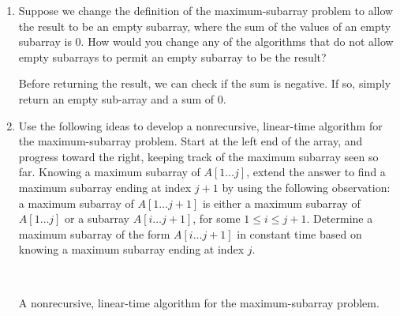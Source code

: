 \documentclass[Chapter04]{subfiles}
\begin{document}
\begin{enumerate}
\begin{answer}
		\end{answer}

		\item Suppose we change the definition of the maximum-subarray problem to allow the result to be an empty subarray, where the sum of the values of an empty subarray is $0$. How would you change any of the algorithms that do not allow empty subarrays to permit an empty subarray to be the result?
		\begin{answer}
			Before returning the result, we can check if the sum is negative. If so, simply return an empty sub-array and a sum of 0.
		\end{answer}

		\item Use the following ideas to develop a nonrecursive, linear-time algorithm for the maximum-subarray problem. Start at the left end of the array, and progress toward the right, keeping track of the maximum subarray seen so far. Knowing a maximum subarray of $A[1 \dots j]$, extend the answer to find a maximum subarray ending at index $j + 1$ by using the following observation: a maximum subarray of $A[1 \dots j + 1]$ is either a maximum subarray of $A[1 \dots j]$ or a subarray $A[i \dots j + 1]$, for some $1 \leq i \leq j + 1$. Determine a maximum subarray of the form $A[i \dots j + 1]$ in constant time based on knowing a maximum subarray ending at index $j$.
		\begin{answer}
			\hfill\\

			\begin{algorithm}[H]
				\caption{A nonrecursive, linear-time algorithm for the maximum-subarray problem.}
				\label{alg:ch04-max-subarray-bruteforce}

			\end{algorithm}
		\end{answer}

	\end{enumerate}
\end{document}
